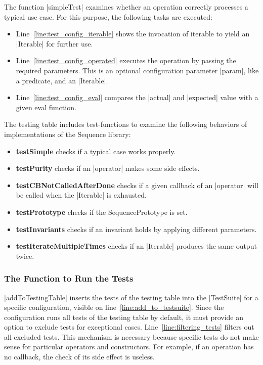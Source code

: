 The function |simpleTest| examines whether an operation correctly processes a typical use case.
For this purpose, the following tasks are executed: 
\begin{itemize}
  \item{Line~\ref{line:test_config_iterable} shows the invocation of
    iterable to yield an |Iterable| for further use.}
  \item{Line~\ref{line:test_config_operated} executes the operation by passing
    the required parameters. This is an optional configuration parameter
  |param|, like a predicate, and an |Iterable|.}
  \item{Line~\ref{line:test_config_eval} compares the |actual| and |expected| value with a given eval function. } 
\end{itemize}

The testing table includes test-functions to examine the following behaviors of
implementations of the Sequence library:

\begin{itemize}
  \item{\textbf{testSimple} checks if a typical case works properly.}
  \item{\textbf{testPurity} checks if an |operator| makes some side effects.}
  \item{\textbf{testCBNotCalledAfterDone} checks if a given callback of an
    |operator| will be called when the |Iterable| is exhausted.}
  \item{\textbf{testPrototype} checks if the SequencePrototype is set.}
  \item{\textbf{testInvariants} checks if an invariant holds by applying different parameters.}
  \item{\textbf{testIterateMultipleTimes} checks if an |Iterable| produces the same output twice.}
\end{itemize}


\subsubsection{The Function to Run the Tests}
\label{subsub:The Function to Run the Tests}
|addToTestingTable| inserts the tests of the testing table into the |TestSuite| for a
specific configuration, visible on line~\ref{line:add_to_testsuite}. 
Since the configuration runs all tests of the testing table by default, it
must provide an option to exclude tests for exceptional cases. 
Line~\ref{line:filtering_tests} filters out all excluded tests.
This mechanism is necessary because specific tests do not make sense for 
particular operators and constructors. For example, if an operation has no
callback, the check of its side effect is useless.

